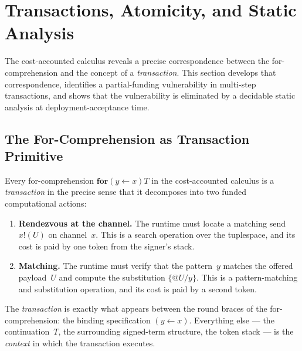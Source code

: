 \documentclass[11pt,a4paper]{article}
\makeatletter
\newcommand{\forc}{\mathbf{for}}
\newcommand{\send}[2]{#1 !\!\left( #2 \right)}
\newcommand{\recv}[3]{\forc\!\left( #1 \leftarrow #2 \right) #3}
\newcommand{\quot}[1]{@#1}
\makeatother
\begin{document}
\section{Transactions, Atomicity, and Static Analysis}
\label{sec:transactions}

The cost-accounted calculus reveals a precise correspondence
between the for-comprehension and the concept of a
\emph{transaction}.  This section develops that correspondence,
identifies a partial-funding vulnerability in multi-step
transactions, and shows that the vulnerability is eliminated by
a decidable static analysis at deployment-acceptance time.

\subsection{The For-Comprehension as Transaction Primitive}
\label{sec:for-as-txn}

Every for-comprehension $\recv{y}{x}{T}$ in the cost-accounted
calculus is a \emph{transaction} in the precise sense that it
decomposes into two funded computational actions:

\begin{enumerate}[nosep]
  \item \textbf{Rendezvous at the channel.}  The runtime must
    locate a matching send $\send{x}{U}$ on channel~$x$.  This
    is a search operation over the tuplespace, and its cost is
    paid by one token from the signer's stack.
  \item \textbf{Matching.}  The runtime must verify that the
    pattern~$y$ matches the offered payload~$U$ and compute
    the substitution $\{\quot{U}/y\}$.  This is a
    pattern-matching and substitution operation, and its cost
    is paid by a second token.
\end{enumerate}

\noindent
The \emph{transaction} is exactly what appears between the
round braces of the for-comprehension: the binding
specification $(y \leftarrow x)$.  Everything else --- the
continuation~$T$, the surrounding signed-term structure, the
token stack --- is the \emph{context} in which the transaction
executes.
\end{document}
